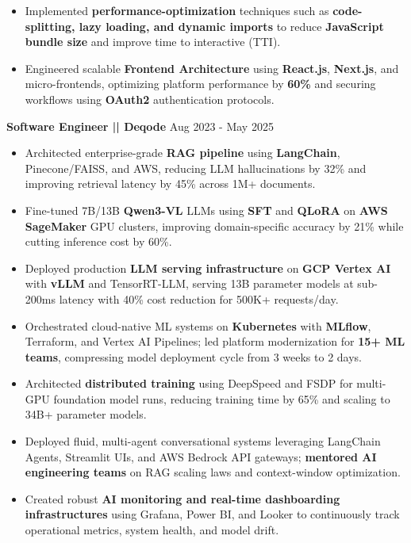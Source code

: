 \documentclass[100pt,a4paper]{article}
\begin{document}
\begin{itemize}
\item {Implemented \textbf{performance-optimization} techniques such as \textbf{code-splitting, lazy loading, and dynamic imports} to reduce \textbf{JavaScript bundle size} and improve time to interactive (TTI).}
\item {Engineered scalable \textbf{Frontend Architecture} using \textbf{React.js}, \textbf{Next.js}, and micro-frontends, optimizing platform performance by \textbf{60\%} and securing workflows using \textbf{OAuth2} authentication protocols.}
\end{itemize}




\vspace{5pt}
\textbf{Software Engineer || Deqode}
\hfill Aug 2023 - May 2025
\begin{itemize}
\vspace{2pt}
\item {Architected enterprise-grade \textbf{RAG pipeline} using \textbf{LangChain}, Pinecone/FAISS, and AWS, reducing LLM hallucinations by 32\% and improving retrieval latency by 45\% across 1M+ documents.}
\item {Fine-tuned 7B/13B \textbf{Qwen3-VL} LLMs using \textbf{SFT} and \textbf{QLoRA} on \textbf{AWS SageMaker} GPU clusters, improving domain-specific accuracy by 21\% while cutting inference cost by 60\%.}
\item {Deployed production \textbf{LLM serving infrastructure} on \textbf{GCP Vertex AI} with \textbf{vLLM} and TensorRT-LLM, serving 13B parameter models at sub-200ms latency with 40\% cost reduction for 500K+ requests/day.}
\item {Orchestrated cloud-native ML systems on \textbf{Kubernetes} with \textbf{MLflow}, Terraform, and Vertex AI Pipelines; led platform modernization for \textbf{15+ ML teams}, compressing model deployment cycle from 3 weeks to 2 days.}
\item {Architected \textbf{distributed training} using DeepSpeed and FSDP for multi-GPU foundation model runs, reducing training time by 65\% and scaling to 34B+ parameter models.}
\item {Deployed fluid, multi-agent conversational systems leveraging LangChain Agents, Streamlit UIs, and AWS Bedrock API gateways; \textbf{mentored AI engineering teams} on RAG scaling laws and context-window optimization.}
\item {Created robust \textbf{AI monitoring and real-time dashboarding infrastructures} using Grafana, Power BI, and Looker to continuously track operational metrics, system health, and model drift.}

\end{itemize}
\end{document}

